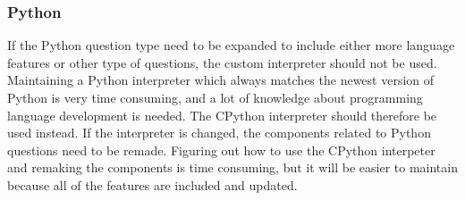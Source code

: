 \subsubsection{Python}
If the Python question type need to be expanded to include either more language features or other type of questions, the custom interpreter should not be used. Maintaining a Python interpreter which always matches the newest version of Python is very time consuming, and a lot of knowledge about programming language development is needed. The CPython interpreter should therefore be used instead. If the interpreter is changed, the components related to Python questions need to be remade. Figuring out how to use the CPython interpeter and remaking the components is time consuming, but it will be easier to maintain because all of the features are included and updated.
